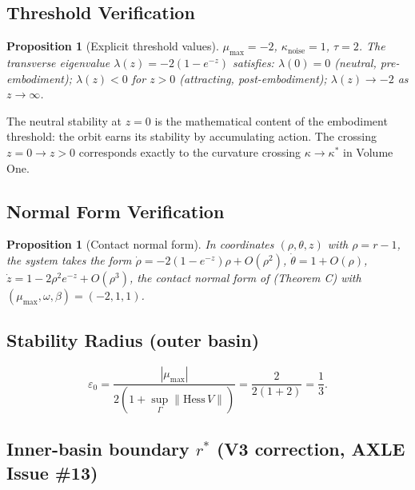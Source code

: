 \documentclass[11pt]{article}
\theoremstyle{boxed}
\newtheorem{proposition}[theorem]{Proposition}
\begin{document}
\subsection{Threshold Verification}

\begin{proposition}[Explicit threshold values]
$\mu_{\max} = -2$, $\kappa_{\mathrm{noise}} = 1$, $\tau = 2$. The transverse
eigenvalue $\lambda(z) = -2(1 - e^{-z})$ satisfies: $\lambda(0) = 0$ (neutral,
pre-embodiment); $\lambda(z) < 0$ for $z > 0$ (attracting, post-embodiment);
$\lambda(z) \to -2$ as $z \to \infty$.
\end{proposition}

The neutral stability at $z = 0$ is the mathematical content of the embodiment
threshold: the orbit earns its stability by accumulating action. The crossing
$z = 0 \to z > 0$ corresponds exactly to the curvature crossing $\kappa \to \kappa^{*}$
in Volume One.

\subsection{Normal Form Verification}

\begin{proposition}[Contact normal form]
In coordinates $(\rho, \theta, z)$ with $\rho = r - 1$, the system takes the form
$\dot{\rho} = -2(1 - e^{-z})\rho + O(\rho^{2})$,
$\dot{\theta} = 1 + O(\rho)$,
$\dot{z} = 1 - 2\rho^{2}e^{-z} + O(\rho^{3})$,
the contact normal form of \cite{GCM} (Theorem C) with $(\mu_{\max}, \omega, \beta) = (-2, 1, 1)$.
\end{proposition}

\subsection{Stability Radius (outer basin)}

\[
\varepsilon_0 = \frac{|\mu_{\max}|}{2(1 + \sup_{\Gamma}\|\mathrm{Hess}\,V\|)} = \frac{2}{2(1 + 2)} = \frac{1}{3}.
\]

\subsection{Inner-basin boundary $r^{*}$ (V3 correction, AXLE Issue \#13)}
\end{document}
